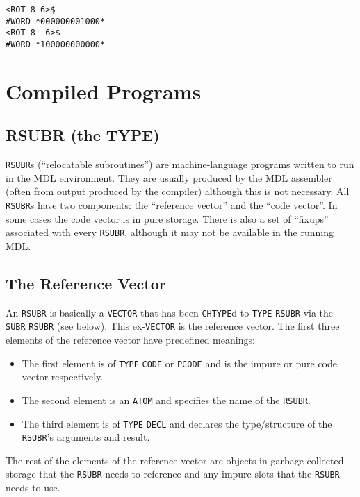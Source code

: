 \documentclass[a4paper]{scrbook}
\providecommand{\tightlist}{%
  \setlength{\itemsep}{0pt}\setlength{\parskip}{0pt}}
\begin{document}
\begin{verbatim}
<ROT 8 6>$
#WORD *000000001000*
<ROT 8 -6>$
#WORD *100000000000*
\end{verbatim}

\chapter{Compiled Programs}\label{chapter-19.-compiled-programs}

\section{RSUBR (the TYPE)}\label{rsubr-the-type}

 \texttt{RSUBR}s (``relocatable subroutines'') are machine-language programs written to run in
the MDL environment. They are usually produced by the MDL assembler (often from output produced by the compiler) although
this is not necessary. All \texttt{RSUBR}s have two components: the ``reference vector'' and the ``code vector''. In some
cases the code vector is in pure storage. There is also a set of ``fixups'' associated with every \texttt{RSUBR}, although
it may not be available in the running MDL.

\section{The Reference Vector}\label{the-reference-vector}

An \texttt{RSUBR} is basically a \texttt{VECTOR} that has been \texttt{CHTYPE}d to \texttt{TYPE} \texttt{RSUBR} via the
\texttt{SUBR} \texttt{RSUBR} (see below). This ex-\texttt{VECTOR} is the reference vector. The first three elements of the
reference vector have predefined meanings:

\begin{itemize}
\tightlist
\item
  The first element is of \texttt{TYPE} \texttt{CODE} or \texttt{PCODE} and is the impure or pure code vector respectively.
\item
  The second element is an \texttt{ATOM} and specifies the name of the \texttt{RSUBR}.
\item
  The third element is of \texttt{TYPE} \texttt{DECL} and declares the type/structure of the \texttt{RSUBR}'s arguments and
  result.
\end{itemize}

The rest of the elements of the reference vector are objects in garbage-collected storage that the \texttt{RSUBR} needs to
reference and any impure slots that the \texttt{RSUBR} needs to use.
\end{document}
